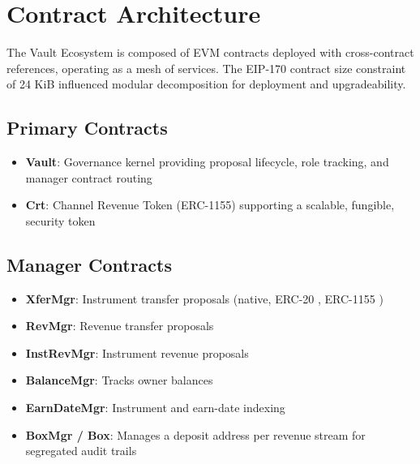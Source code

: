 \documentclass[10pt]{article}
\begin{document}
\section{Contract Architecture}
The Vault Ecosystem is composed of EVM contracts deployed with cross-contract references, operating
as a mesh of services. The EIP-170 contract size constraint of 24 KiB influenced modular decomposition
for deployment and upgradeability.

\subsection{Primary Contracts}
\begin{itemize}
    \item \textbf{Vault}: Governance kernel providing proposal lifecycle, role tracking, and manager contract routing

    \item \textbf{Crt}: Channel Revenue Token (ERC-1155) supporting a scalable, fungible, security token
\end{itemize}

\subsection{Manager Contracts}
\begin{itemize}
    \item \textbf{XferMgr}: Instrument transfer proposals (native, ERC-20 \cite{ethereum_erc20}, ERC-1155 \cite{ethereum_erc1155})

    \item \textbf{RevMgr}: Revenue transfer proposals

    \item \textbf{InstRevMgr}: Instrument revenue proposals

    \item \textbf{BalanceMgr}: Tracks owner balances

    \item \textbf{EarnDateMgr}: Instrument and earn-date indexing

    \item \textbf{BoxMgr / Box}: Manages a deposit address per revenue stream for segregated audit trails
\end{itemize}
\end{document}
